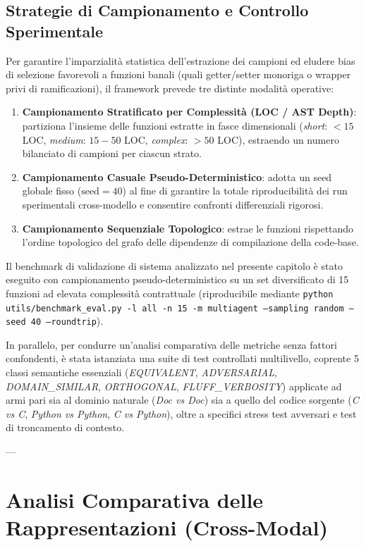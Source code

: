 \subsection{Strategie di Campionamento e Controllo Sperimentale}
Per garantire l'imparzialità statistica dell'estrazione dei campioni ed eludere bias di selezione favorevoli a funzioni banali (quali getter/setter monoriga o wrapper privi di ramificazioni), il framework prevede tre distinte modalità operative:
\begin{enumerate}
    \item \textbf{Campionamento Stratificato per Complessità (LOC / AST Depth)}: partiziona l'insieme delle funzioni estratte in fasce dimensionali (\emph{short}: $< 15$ LOC, \emph{medium}: $15-50$ LOC, \emph{complex}: $> 50$ LOC), estraendo un numero bilanciato di campioni per ciascun strato.
    \item \textbf{Campionamento Casuale Pseudo-Deterministico}: adotta un seed globale fisso ($\text{seed} = 40$) al fine di garantire la totale riproducibilità dei run sperimentali cross-modello e consentire confronti differenziali rigorosi.
    \item \textbf{Campionamento Sequenziale Topologico}: estrae le funzioni rispettando l'ordine topologico del grafo delle dipendenze di compilazione della code-base.
\end{enumerate}

Il benchmark di validazione di sistema analizzato nel presente capitolo è stato eseguito con campionamento pseudo-deterministico su un set diversificato di 15 funzioni ad elevata complessità contrattuale (riproducibile mediante \texttt{python utils/benchmark\_eval.py -l all -n 15 -m multiagent --sampling random --seed 40 --roundtrip}).

In parallelo, per condurre un'analisi comparativa delle metriche senza fattori confondenti, è stata istanziata una suite di test controllati multilivello, coprente 5 classi semantiche essenziali (\emph{EQUIVALENT}, \emph{ADVERSARIAL}, \emph{DOMAIN\_SIMILAR}, \emph{ORTHOGONAL}, \emph{FLUFF\_VERBOSITY}) applicate ad armi pari sia al dominio naturale (\emph{Doc vs Doc}) sia a quello del codice sorgente (\emph{C vs C}, \emph{Python vs Python}, \emph{C vs Python}), oltre a specifici stress test avversari e test di troncamento di contesto.

---

\section{Analisi Comparativa delle Rappresentazioni (Cross-Modal)}
\label{sec:analisi_cross_modal}

